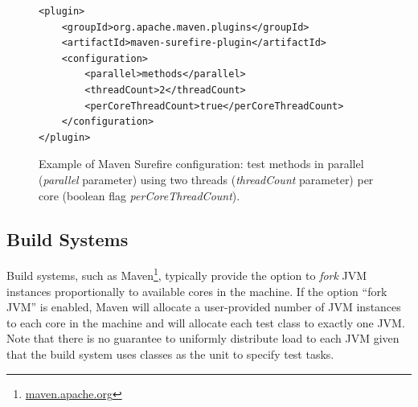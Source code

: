 \begin{figure}[h!]
\centering
\scriptsize
{}
\begin{lstlisting}
<plugin>
    <groupId>org.apache.maven.plugins</groupId>
    <artifactId>maven-surefire-plugin</artifactId>
    <configuration>
        <parallel>methods</parallel>
        <threadCount>2</threadCount>
        <perCoreThreadCount>true</perCoreThreadCount>
    </configuration>
</plugin>
\end{lstlisting}
\caption{\label{fig:surefire} Example of Maven Surefire configuration:
    test methods in parallel (\emph{parallel} parameter) using two
    threads (\emph{threadCount} parameter) per core (boolean flag
    \emph{perCoreThreadCount}).}
\end{figure}


\subsection{Build Systems}
Build systems, such as Maven\footnote{\url{maven.apache.org}},
typically provide the option to \emph{fork} JVM instances
proportionally to available cores in the machine.  If the option
``fork JVM'' is enabled, Maven will allocate a user-provided number of
JVM instances to each core in the machine and will allocate each test
class to exactly one JVM.  Note that there is no guarantee to
uniformly distribute load to each JVM given that the build system uses
classes as the unit to specify test tasks.
